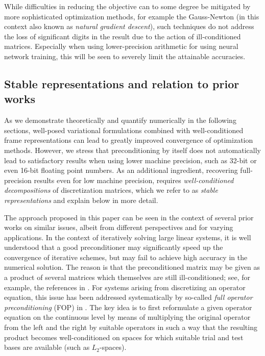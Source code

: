 \documentclass[a4paper,11pt]{amsart}
\numberwithin{equation}{section}
\theoremstyle{definition}
\theoremstyle{remark}
\theoremstyle{plain}
\begin{document}
While difficulties in reducing the objective  can to some degree be mitigated by more sophisticated optimization methods, for example the Gauss-Newton (in this context also known as \emph{natural gradient descent}),   such techniques do not address the loss of significant digits in the result due to the action of ill-conditioned matrices. Especially when using lower-precision arithmetic for using neural network training, this will be seen to  severely limit the attainable accuracies.

\subsection{Stable representations and relation to prior works}

As we demonstrate theoretically and quantify numerically in the following sections, well-posed variational formulations combined with well-conditioned frame representations can lead to greatly improved convergence of optimization methods. 
However, we stress that preconditioning by itself does not automatically lead to satisfactory results when using lower machine precision, such as 32-bit or even 16-bit floating point numbers. As an additional ingredient, recovering full-precision results even for low machine precision,  requires {\em well-conditioned decompositions} of discretization matrices, which we refer to as {\em stable representations} and explain below in  more detail. 
%
%

The approach proposed in this paper can be seen in the context of   several prior works on similar issues, albeit from
different perspectives and for varying applications. In the context of iteratively solving
large linear systems, it is well understood that   a good preconditioner may significantly speed up
the convergence of iterative schemes, but may fail to achieve high accuracy in the numerical solution. The reason is that   the preconditioned matrix may be given as a product of several matrices which themselves are still ill-conditioned; see, for example, the references in \cite{MR4839137}.
For systems arising from discretizing an operator equation, this issue has been addressed systematically by so-called {\em full operator preconditioning} (FOP) in \cite{MR4839137}. The key idea is to first reformulate a given operator equation on the continuous level by means of multiplying the original operator from the left and the right by suitable operators in such a way that the resulting product becomes well-conditioned on spaces for which suitable trial and test bases are available (such as $L_2$-spaces).
\end{document}
